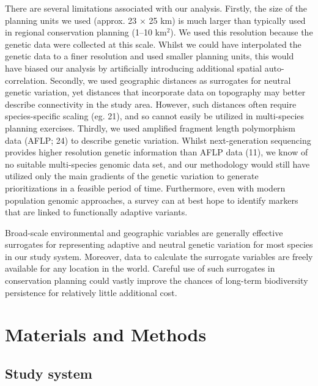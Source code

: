 \documentclass[9pt,twocolumn,twoside,lineno]{pnas-new}
\begin{document}
There are several limitations associated with our analysis. Firstly, the
size of the planning units we used (approx. 23 \(\times\) 25 km) is much
larger than typically used in regional conservation planning (1--10
km\(^2\)). We used this resolution because the genetic data were
collected at this scale. Whilst we could have interpolated the genetic
data to a finer resolution and used smaller planning units, this would
have biased our analysis by artificially introducing additional spatial
auto-correlation. Secondly, we used geographic distances as surrogates
for neutral genetic variation, yet distances that incorporate data on
topography may better describe connectivity in the study area. However,
such distances often require species-specific scaling (eg. 21), and so
cannot easily be utilized in multi-species planning exercises. Thirdly,
we used amplified fragment length polymorphism data (AFLP; 24) to
describe genetic variation. Whilst next-generation sequencing provides
higher resolution genetic information than AFLP data (11), we know of no
suitable multi-species genomic data set, and our methodology would still
have utilized only the main gradients of the genetic variation to
generate prioritizations in a feasible period of time. Furthermore, even
with modern population genomic approaches, a survey can at best hope to
identify markers that are linked to functionally adaptive variants.

Broad-scale environmental and geographic variables are generally
effective surrogates for representing adaptive and neutral genetic
variation for most species in our study system. Moreover, data to
calculate the surrogate variables are freely available for any location
in the world. Careful use of such surrogates in conservation planning
could vastly improve the chances of long-term biodiversity persistence
for relatively little additional cost.

\section*{Materials and Methods}\label{materials-and-methods}

\subsection*{Study system}\label{study-system}
\end{document}
